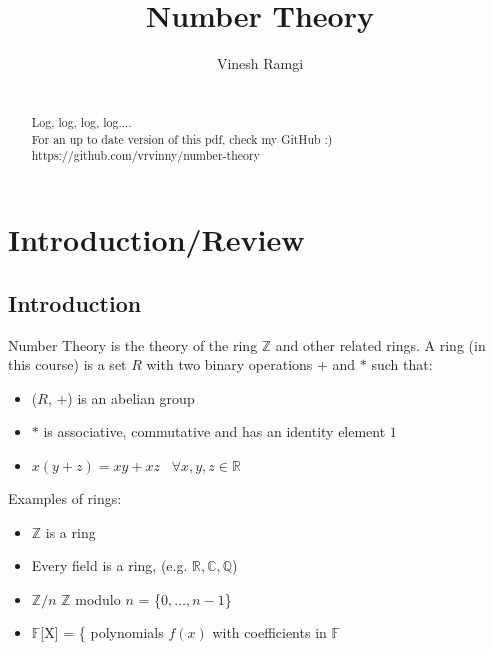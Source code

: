 \documentclass[11pt]{article}
\begin{document}
\newtheorem{theorem}{Theorem}[section]
\newtheorem{definition}[theorem]{Defintion}
\newtheorem{proposition}[theorem]{Proposition}
\newtheorem{corollary}[theorem]{Corollary}
\newtheorem{lemma}[theorem]{Lemma}

\title{Number Theory}
\author{Vinesh Ramgi}
	\maketitle


\newpage
	\begin{abstract}

		\\[1em]
		Log, log, log, log....\\[2em]

		For an up to date version of this pdf, check my GitHub :)\\[1em]
https://github.com/vrvinny/number-theory
	\end{abstract}
\newpage
\tableofcontents{}
\newpage
	\section{Introduction/Review}
	\subsection{Introduction}
	Number Theory is the theory of the ring $\mathbb{Z}$ and other related rings. A ring (in this course) is a set $R$ with two binary operations $+$ and $*$ such that:
	\begin{itemize}
		\item ($R$, $+$) is an abelian group
		\item $*$ is associative, commutative and has an identity element $1$
		\item $x(y+z) = xy + xz \hspace{10pt} \forall x,y,z \in \mathbb{R} $

	\end{itemize}
Examples of rings:
	\begin{itemize}
		\item $\mathbb{Z}$ is a ring
		\item Every field is a ring, (e.g. $\mathbb{R}, \mathbb{C}, \mathbb{Q}$)
		\item $\mathbb{Z}/n$ \hspace{10pt} $\mathbb{Z}$ modulo $n$ = \{$0, \dots, n-1$\}
		\item $\mathbb{F}$[X] = \{ polynomials $f(x)$ with coefficients in $\mathbb{F}$


	\end{itemize}
\end{document}
